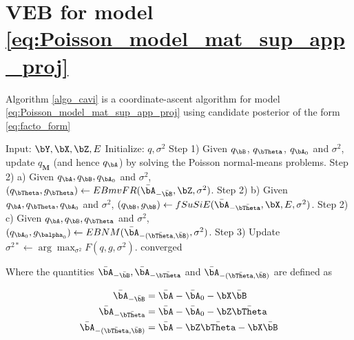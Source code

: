  \section{VEB for model \ref{eq:Poisson_model_mat_sup_app_proj}}

  

\begin{theorem}
    Algorithm  \ref{algo_cavi}  is a coordinate-ascent algorithm for model \ref{eq:Poisson_model_mat_sup_app_proj}  using candidate posterior of the form \ref{eq:facto_form}
\end{theorem}



\begin{algorithm}
\caption{Splitting Variational Bayes approach for inhomogeneous Poisson detialed} 
\begin{algorithmic}[1]\label{algo_cavi}
 \STATE Input: $\bY, \bX, \bZ, E$  
 \STATE Initialize: $q, \sigma^2$  
 \REPEAT 
 \STATE Step 1) Given $q_{\bB}$, $q_{\bTheta}$, $q_{\bA_0}$ and $\sigma^2$, update $q_{\bm M}$ (and hence $q_{\bA}$) by solving the Poisson normal-means problems.
\STATE Step 2) a) Given $q_{\bA},q_{\bB},q_{\bA_0}$ and $\sigma^2$, $(q_{\bTheta},g_{\bTheta})\leftarrow EBmvFR(\bar\bA_{-\bar{\bB}},\bZ,\sigma^2)$.
\STATE Step 2) b) Given $q_{\bA},q_{\bTheta},q_{\bA_0}$ and $\sigma^2$, $(q_{\bB},g_{\bB})\leftarrow fSuSiE(\bar\bA_{-\bar{\bTheta}},\bX,E,\sigma^2)$.
\STATE Step 2) c) Given $q_{\bA},q_{\bB},q_{\bTheta}$ and $\sigma^2$, $(q_{\bA_0},g_{\balpha_0})\leftarrow EBNM(\bar\bA_{-(\bar{\bTheta},\bar{\bB})},\sigma^2)$.
\STATE Step 3) Update $\sigma^{2*}\leftarrow\arg\max_{\sigma^2}F(q,g,\sigma^2)$.
\UNTIL converged
\end{algorithmic}
\end{algorithm}

Where the quantities $\bar\bA_{- \bar{\bB}},\bar\bA_{- \bar{\bTheta}}$ and $ \bar\bA_{- (\bar{\bTheta}, \bar{\bB})}$ are defined as 


\begin{align}
     \bar\bA_{- \bar{\bB}}&= \bar\bA - \bar\bA_0 -\bX\bar\bB\\
     \bar\bA_{- \bar{\bTheta}}&= \bar\bA - \bar\bA_0 -\bZ\bar\bTheta\\
     \bar\bA_{- (\bar{\bTheta}, \bar{\bB})}&= \bar\bA -\bZ\bar\bTheta  -\bX\bar\bB
 \end{align}
 
  


